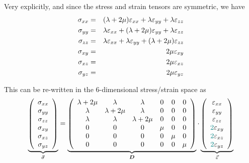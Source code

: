 Very explicitly, and since the stress and strain tensors are symmetric, we have
\begin{eqnarray}
\sigma_{xx} &=& (\lambda+2\mu)  \varepsilon_{xx} + \lambda \varepsilon_{yy} + \lambda \varepsilon_{zz} \nonumber\\
\sigma_{yy} &=& \lambda \varepsilon_{xx} + (\lambda+2\mu)  {\varepsilon}_{yy} + \lambda \varepsilon_{zz}\nonumber\\
\sigma_{zz} &=& \lambda \varepsilon_{xx} + \lambda \varepsilon_{yy} + (\lambda+2\mu)  {\varepsilon}_{zz} \nonumber\\
\sigma_{xy} &=& 2\mu  {\varepsilon}_{xy} \nonumber\\
\sigma_{xz} &=& 2\mu  {\varepsilon}_{xz} \nonumber\\
\sigma_{yz} &=& 2\mu  {\varepsilon}_{yz} 
\end{eqnarray}




This can be re-written in the 6-dimensional stress/strain space as
\begin{equation}
\underbrace{
\left(
\begin{array}{c}
\sigma_{xx} \\
\sigma_{yy} \\
\sigma_{zz} \\
\sigma_{xy} \\
\sigma_{xz} \\
\sigma_{yz} 
\end{array}
\right)}
_{\vec{\sigma}}
=
\underbrace{
\left(
\begin{array}{cccccc}
\lambda+2\mu & \lambda & \lambda & 0 & 0 & 0 \\ 
\lambda & \lambda+2\mu & \lambda & 0 & 0 & 0 \\ 
\lambda & \lambda & \lambda+2\mu & 0 & 0 & 0 \\
0 & 0 & 0 & \mu & 0 & 0 \\ 
0 & 0 & 0 & 0 & \mu & 0 \\ 
0 & 0 & 0 & 0 & 0 & \mu  
\end{array}
\right)}
_{{\bm D}}
\cdot
\underbrace{
\left(
\begin{array}{c}
\varepsilon_{xx} \\
\varepsilon_{yy} \\
\varepsilon_{zz} \\
{\color{teal}2}\varepsilon_{xy} \\
{\color{teal}2}\varepsilon_{xz} \\
{\color{teal}2}\varepsilon_{yz} 
\end{array}
\right)}
_{\vec{\varepsilon}}
\label{eq:el:vectors}
\end{equation}

